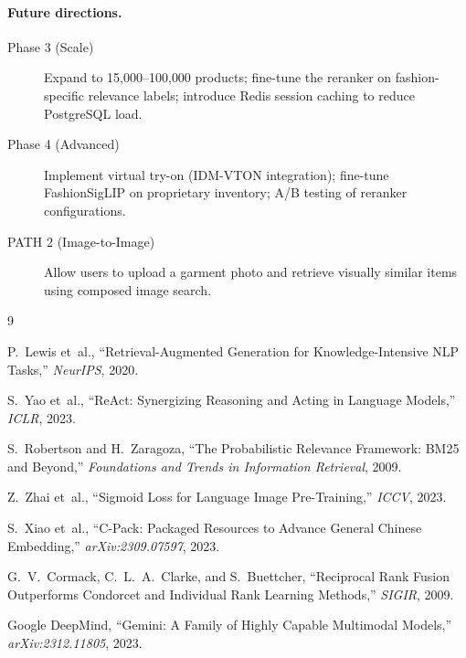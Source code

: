 \documentclass[12pt,a4paper]{article}
\begin{document}
\paragraph{Future directions.}
\begin{description}
  \item[Phase 3 (Scale)] Expand to 15{,}000–100{,}000 products;
    fine-tune the reranker on fashion-specific relevance labels;
    introduce Redis session caching to reduce PostgreSQL load.
  \item[Phase 4 (Advanced)] Implement virtual try-on
    (IDM-VTON integration); fine-tune FashionSigLIP on proprietary
    inventory; A/B testing of reranker configurations.
  \item[PATH 2 (Image-to-Image)] Allow users to upload a garment photo
    and retrieve visually similar items using composed image search.
\end{description}

\newpage
\begin{thebibliography}{9}

P.~Lewis et~al., ``Retrieval-Augmented Generation for Knowledge-Intensive NLP Tasks,''
\textit{NeurIPS}, 2020.

S.~Yao et~al., ``ReAct: Synergizing Reasoning and Acting in Language Models,''
\textit{ICLR}, 2023.

S.~Robertson and H.~Zaragoza, ``The Probabilistic Relevance Framework: BM25 and Beyond,''
\textit{Foundations and Trends in Information Retrieval}, 2009.

Z.~Zhai et~al., ``Sigmoid Loss for Language Image Pre-Training,''
\textit{ICCV}, 2023.

S.~Xiao et~al., ``C-Pack: Packaged Resources to Advance General Chinese Embedding,''
\textit{arXiv:2309.07597}, 2023.

G.~V.~Cormack, C.~L.~A.~Clarke, and S.~Buettcher,
``Reciprocal Rank Fusion Outperforms Condorcet and Individual Rank Learning Methods,''
\textit{SIGIR}, 2009.

Google DeepMind, ``Gemini: A Family of Highly Capable Multimodal Models,''
\textit{arXiv:2312.11805}, 2023.

\end{thebibliography}
\end{document}
